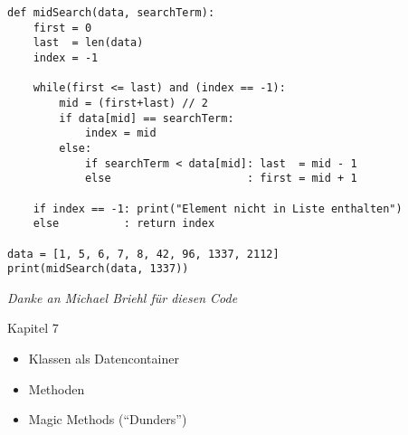 \begin{frame}[fragile]
%
\begin{codebox}
\begin{verbatim}
def midSearch(data, searchTerm):
    first = 0
    last  = len(data)
    index = -1
    
    while(first <= last) and (index == -1):
        mid = (first+last) // 2
        if data[mid] == searchTerm:
            index = mid
        else:
            if searchTerm < data[mid]: last  = mid - 1
            else                     : first = mid + 1

    if index == -1: print("Element nicht in Liste enthalten")
    else          : return index

data = [1, 5, 6, 7, 8, 42, 96, 1337, 2112]
print(midSearch(data, 1337))
\end{verbatim}
\end{codebox}
%
\begin{flushright}
\scriptsize \emph{Danke an Michael Briehl für diesen Code}
\end{flushright}
%
\end{frame}


\begin{frame}[fragile]{Kapitel 7}
%
\begin{itemize}
\item Klassen als Datencontainer
\item Methoden
\item Magic Methods (\enquote{Dunders})
\end{itemize}
%
\end{frame}



